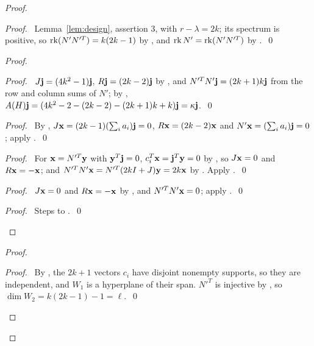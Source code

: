 \begin{proof}
 \begin{proof}\pf\ Lemma~\ref{lem:design}, assertion 3, with $r-\lambda=2k$; its spectrum is
  positive, so $\mathop{\mathrm{rk}}\nolimits(N'N'^T)=k(2k-1)$ by , and $\mathop{\mathrm{rk}}\nolimits N'=\mathop{\mathrm{rk}}\nolimits(N'N'^T)$ by
  .~\qed\end{proof}
 \begin{proof}
  \begin{proof}\pf\ $J{\mathbf j}=(4k^2-1){\mathbf j}$, $R{\mathbf j}=(2k-2){\mathbf j}$ by , and
   $N'^TN'{\mathbf j}=(2k+1)k{\mathbf j}$ from the row and column sums of $N'$; by ,
   $A(H){\mathbf j}=(4k^2-2-(2k-2)-(2k+1)k+k){\mathbf j}=\kappa{\mathbf j}$.~\qed\end{proof}
  \begin{proof}\pf\ By , $J{\mathbf x}=(2k-1)(\sum_ia_i){\mathbf j}=0$,
   $R{\mathbf x}=(2k-2){\mathbf x}$ and $N'{\mathbf x}=(\sum_ia_i){\mathbf j}=0$; apply .~\qed\end{proof}
  \begin{proof}\pf\ For ${\mathbf x}=N'^T{\mathbf y}$ with ${\mathbf y}^T{\mathbf j}=0$, $c_i^T{\mathbf x}={\mathbf j}^T{\mathbf y}=0$ by
   , so $J{\mathbf x}=0$ and $R{\mathbf x}=-{\mathbf x}$; and $N'^TN'{\mathbf x}=N'^T(2kI+J){\mathbf y}=2k{\mathbf x}$ by
   . Apply .~\qed\end{proof}
  \begin{proof}\pf\ $J{\mathbf x}=0$ and $R{\mathbf x}=-{\mathbf x}$ by , and $N'^TN'{\mathbf x}=0$; apply
   .~\qed\end{proof}
  \qedstep
  \begin{proof}\pf\ Steps  to .~\qed\end{proof}
 \end{proof}
 \begin{proof}
  \begin{proof}\pf\ By , the $2k+1$ vectors $c_i$ have disjoint nonempty
   supports, so they are independent, and $W_1$ is a hyperplane of their span. $N'^T$ is
   injective by , so $\dim W_2=k(2k-1)-1=\ell$.~\qed\end{proof}

\end{proof}
\end{proof}
